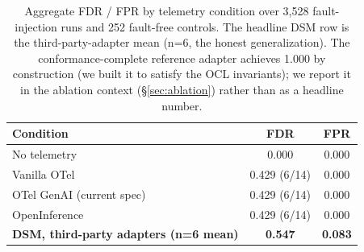 \documentclass[sigconf,review]{acmart}
\begin{document}
\begin{table}[t]
\centering
\small
\caption{Aggregate FDR / FPR by telemetry condition over 3{,}528
fault-injection runs and 252 fault-free controls.  The headline DSM
row is the third-party-adapter mean (n=6, the honest generalization).
The conformance-complete reference adapter achieves 1.000 by
construction (we built it to satisfy the OCL invariants); we report
it in the ablation context (\S\ref{sec:ablation}) rather than as a
headline number.}
\label{tab:fdr}
\begin{tabular}{@{}lcc@{}}
\toprule
\textbf{Condition} & \textbf{FDR} & \textbf{FPR} \\
\midrule
No telemetry              & 0.000 & 0.000 \\
Vanilla OTel              & 0.429 (6/14) & 0.000 \\
OTel GenAI (current spec) & 0.429 (6/14) & 0.000 \\
OpenInference             & 0.429 (6/14) & 0.000 \\
\textbf{DSM, third-party adapters (n=6 mean)} & \textbf{0.547} & \textbf{0.083} \\
\bottomrule
\end{tabular}
\end{table}
\end{document}
